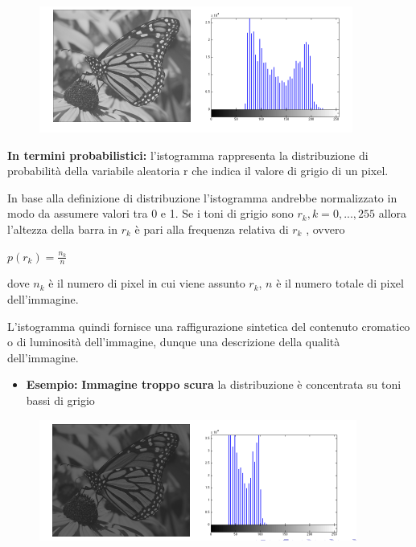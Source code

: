 \begin{figure}[H]
    \centering
    \includegraphics[width=\linewidth, keepaspectratio]{capitoli/immagini/imgs/esempio-istogramma.png}
\end{figure}

\textbf{In termini probabilistici:} l'istogramma rappresenta la distribuzione di probabilità della variabile aleatoria r che indica il
valore di grigio di un pixel.

\begin{definition}
    In base alla definizione di distribuzione l'istogramma andrebbe normalizzato in modo da assumere valori tra 0 e 1.
    Se i toni di grigio sono $r_k, k = 0, . . . , 255$ allora l'altezza della barra in $r_k$ è pari alla frequenza relativa di $r_k$ , ovvero
    \begin{center}
        $p(r_k) = \frac{n_k}{n}$
    \end{center}
    dove $n_k$ è il numero di pixel in cui viene assunto $r_k$, $n$ è il numero totale di pixel dell'immagine.
\end{definition}

L'istogramma quindi fornisce una raffigurazione sintetica del contenuto cromatico o di luminosità dell'immagine, dunque una descrizione
della qualità dell'immagine.

\begin{itemize}
    \item \textbf{Esempio:} \textbf{Immagine troppo scura}
          la distribuzione è concentrata su toni bassi di grigio
\end{itemize}

\begin{figure}[H]
    \centering
    \includegraphics[width=\linewidth, keepaspectratio]{capitoli/immagini/imgs/isto-scuro.png}
\end{figure}

